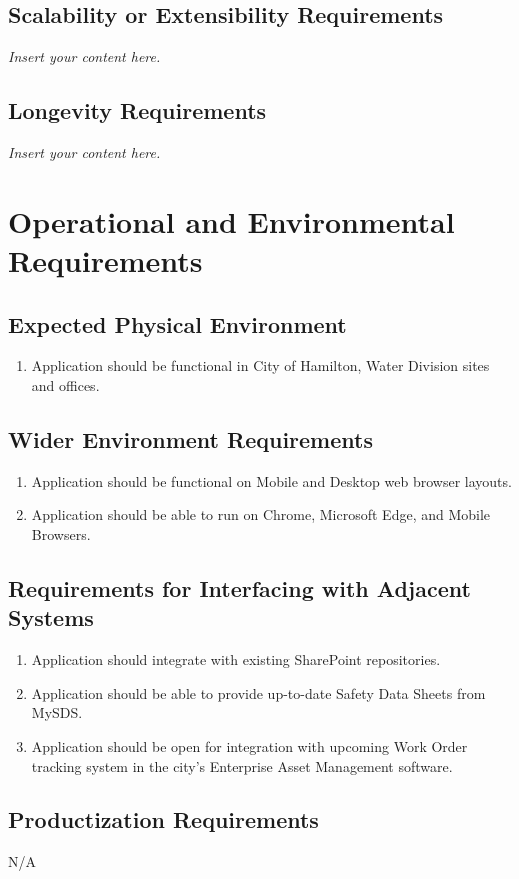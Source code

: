 \documentclass[12pt]{article}
\newcommand{\lips}{\textit{Insert your content here.}}
\begin{document}
\subsection{Scalability or Extensibility Requirements}
\lips
\subsection{Longevity Requirements}
\lips

\section{Operational and Environmental Requirements}
\subsection{Expected Physical Environment}
\begin{enumerate} [{OE-PE}1.]
  \item Application should be functional in City of Hamilton, Water Division sites and offices.
\end{enumerate}
\subsection{Wider Environment Requirements}
\begin{enumerate} [{OE-WE}1.]
  \item Application should be functional on Mobile and Desktop web browser layouts.
  \item Application should be able to run on Chrome, Microsoft Edge, and Mobile Browsers.
\end{enumerate}
\subsection{Requirements for Interfacing with Adjacent Systems}
\begin{enumerate} [{OE-IAS}1.]
  \item Application should integrate with existing SharePoint repositories.
  \item Application should be able to provide up-to-date Safety Data Sheets from MySDS.
  \item Application should be open for integration with upcoming Work Order tracking system in the city's Enterprise Asset Management software.
\end{enumerate}
\subsection{Productization Requirements}
N/A
\end{document}
